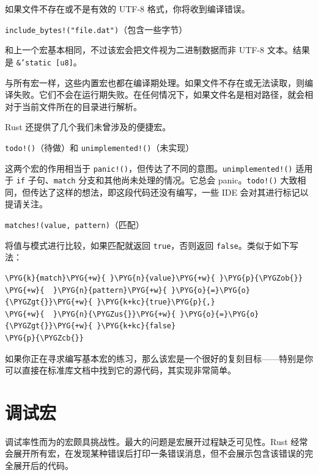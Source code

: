 如果文件不存在或不是有效的 UTF-8 格式，你将收到编译错误。

\begin{myNote}
\texttt{include\_bytes!("file.dat")}（包含一些字节）
\end{myNote}

和上一个宏基本相同，不过该宏会把文件视为二进制数据而非 UTF-8 文本。结果是 \texttt{\&'static [u8]}。

与所有宏一样，这些内置宏也都在编译期处理。如果文件不存在或无法读取，则编译失败。它们不会在运行期失败。在任何情况下，如果文件名是相对路径，就会相对于当前文件所在的目录进行解析。

Rust 还提供了几个我们未曾涉及的便捷宏。

\begin{myNote}
\texttt{todo!()}（待做）和 \texttt{unimplemented!()}（未实现）
\end{myNote}

这两个宏的作用相当于 \texttt{panic!()}，但传达了不同的意图。\texttt{unimplemented!()} 适用于 \texttt{if} 子句、\texttt{match} 分支和其他尚未处理的情况。它总会 panic。\texttt{todo!()} 大致相同，但传达了这样的想法，即这段代码还没有编写，一些 IDE 会对其进行标记以提请关注。

\begin{mySidenote}
\texttt{matches!(value, pattern)}（匹配）
\end{mySidenote}

将值与模式进行比较，如果匹配就返回 \texttt{true}，否则返回 \texttt{false}。类似于如下写法：

\begin{Verbatim}[commandchars=\\\{\},breaklines=true,breakanywhere=true,fontsize=\codefont,xleftmargin=17bp]
\PYG{k}{match}\PYG{+w}{ }\PYG{n}{value}\PYG{+w}{ }\PYG{p}{\PYGZob{}}
\PYG{+w}{  }\PYG{n}{pattern}\PYG{+w}{ }\PYG{o}{=}\PYG{o}{\PYGZgt{}}\PYG{+w}{ }\PYG{k+kc}{true}\PYG{p}{,}
\PYG{+w}{  }\PYG{n}{\PYGZus{}}\PYG{+w}{ }\PYG{o}{=}\PYG{o}{\PYGZgt{}}\PYG{+w}{ }\PYG{k+kc}{false}
\PYG{p}{\PYGZcb{}}
\end{Verbatim}

如果你正在寻求编写基本宏的练习，那么该宏是一个很好的复刻目标——特别是你可以直接在标准库文档中找到它的源代码，其实现非常简单。

\section{调试宏}

调试率性而为的宏颇具挑战性。最大的问题是宏展开过程缺乏可见性。Rust 经常会展开所有宏，在发现某种错误后打印一条错误消息，但不会展示包含该错误的完全展开后的代码。

